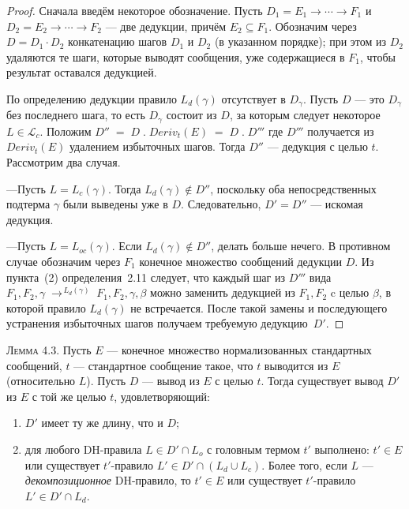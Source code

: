 \begin{proof}
Сначала введём некоторое обозначение.  
Пусть $D_{1}=E_{1}\to\cdots\to F_{1}$ и
$D_{2}=E_{2}\to\cdots\to F_{2}$ — две
дедукции, причём $E_{2}\subseteq F_{1}$.
Обозначим через $D=D_{1}\!\cdot D_{2}$ конкатенацию шагов $D_{1}$ и $D_{2}$
(в указанном порядке); при этом из $D_{2}$ удаляются те шаги,
которые выводят сообщения, уже содержащиеся в $F_{1}$,
чтобы результат оставался дедукцией.

По определению дедукции правило $L_{d}(\gamma)$ отсутствует в $D_{\gamma}$.
Пусть $D$ — это $D_{\gamma}$ без последнего шага, то есть
$D_{\gamma}$ состоит из $D$, за которым следует некоторое
$L\in\mathcal L_{c}$.
Положим
\(
  D'' \;=\;
  D \;.\;
  Deriv_{t}(E)
  \;=\;
  D\;.\;D'''
\)
где $D'''$ получается из $Deriv_{t}(E)$ удалением избыточных шагов.
Тогда $D''$ — дедукция с целью $t$.
Рассмотрим два случая.

\medskip\noindent
—\;Пусть $L=L_{c}(\gamma)$.
Тогда $L_{d}(\gamma)\notin D''$, поскольку оба непосредственных
подтерма $\gamma$ были выведены уже в $D$.
Следовательно, $D' = D''$ — искомая дедукция.

\smallskip\noindent
—\;Пусть $L=L_{oc}(\gamma)$.
Если $L_{d}(\gamma)\notin D''$, делать больше нечего.
В противном случае обозначим через $F_{1}$ конечное множество сообщений
дедукции $D$.
Из пункта~(2) определения~2.11 следует, что каждый шаг из $D'''$
вида
\(
  F_{1},F_{2},\gamma
    \;\longrightarrow^{\,L_{d}(\gamma)}\;
  F_{1},F_{2},\gamma,\beta
\)
можно заменить дедукцией из $F_{1},F_{2}$ c целью $\beta$,
в которой правило $L_{d}(\gamma)$ не встречается.
После такой замены и последующего устранения избыточных
шагов получаем требуемую дедукцию~$D'$.
\end{proof}


\textsc{Лемма 4.3.}
Пусть \(E\) — конечное множество нормализованных стандартных сообщений,
\(t\) — стандартное сообщение такое, что \(t\) выводится из \(E\) (относительно \(L\)).
Пусть \(D\) — вывод из \(E\) с целью \(t\).
Тогда существует вывод \(D'\) из \(E\) с той же целью \(t\), удовлетворяющий:

\begin{enumerate}
  \item \(D'\) имеет ту же длину, что и \(D\);
  \item для любого DH-правила \(L\in D'\cap L_{o}\) с головным термом \(t'\)
        выполнено: \(t'\in E\) \;или\;  
        существует \(t'\)-правило \(L'\in D'\cap(L_{d}\cup L_{c})\).
        Более того, если \(L\) — \emph{декомпозиционное} DH-правило,
        то \(t'\in E\) \;или\;
        существует \(t'\)-правило \(L'\in D'\cap L_{d}\).
\end{enumerate}

